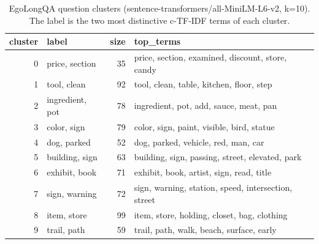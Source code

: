 \begin{table}[t]
\centering
\small
\caption{EgoLongQA question clusters (sentence-transformers/all-MiniLM-L6-v2, k=10). The label is the two most distinctive c-TF-IDF terms of each cluster.}
\label{tab:clusters_minilm}
\begin{tabular}{rlrl}
\toprule
cluster & label & size & top\_terms \\
\midrule
0 & price, section & 35 & price, section, examined, discount, store, candy \\
1 & tool, clean & 92 & tool, clean, table, kitchen, floor, step \\
2 & ingredient, pot & 78 & ingredient, pot, add, sauce, meat, pan \\
3 & color, sign & 79 & color, sign, paint, visible, bird, statue \\
4 & dog, parked & 52 & dog, parked, vehicle, red, man, car \\
5 & building, sign & 63 & building, sign, passing, street, elevated, park \\
6 & exhibit, book & 71 & exhibit, book, artist, sign, read, title \\
7 & sign, warning & 72 & sign, warning, station, speed, intersection, street \\
8 & item, store & 99 & item, store, holding, closet, bag, clothing \\
9 & trail, path & 59 & trail, path, walk, beach, surface, early \\
\bottomrule
\end{tabular}
\end{table}
